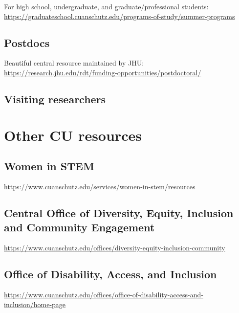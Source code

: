 \documentclass[
  letterpaper,
  DIV=11,
  numbers=noendperiod]{scrreprt}
\begin{document}
For high school, undergraduate, and graduate/professional students:
\url{https://graduateschool.cuanschutz.edu/programs-of-study/summer-programs}

\hypertarget{postdocs}{%
\subsection{Postdocs}\label{postdocs}}

Beautiful central resource maintained by JHU:
\url{https://research.jhu.edu/rdt/funding-opportunities/postdoctoral/}

\hypertarget{visiting-researchers}{%
\subsection{Visiting researchers}\label{visiting-researchers}}

\hypertarget{other-cu-resources}{%
\section{Other CU resources}\label{other-cu-resources}}

\hypertarget{women-in-stem}{%
\subsection{Women in STEM}\label{women-in-stem}}

\url{https://www.cuanschutz.edu/services/women-in-stem/resources}

\hypertarget{central-office-of-diversity-equity-inclusion-and-community-engagement}{%
\subsection{Central Office of Diversity, Equity, Inclusion and Community
Engagement}\label{central-office-of-diversity-equity-inclusion-and-community-engagement}}

\url{https://www.cuanschutz.edu/offices/diversity-equity-inclusion-community}

\hypertarget{office-of-disability-access-and-inclusion}{%
\subsection{Office of Disability, Access, and
Inclusion}\label{office-of-disability-access-and-inclusion}}

\url{https://www.cuanschutz.edu/offices/office-of-disability-access-and-inclusion/home-page}
\end{document}
